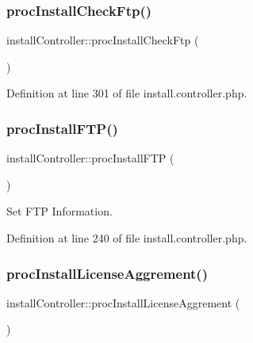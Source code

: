 \subsubsection{\texorpdfstring{proc\+Install\+Check\+Ftp()}{procInstallCheckFtp()}}
{\footnotesize\ttfamily install\+Controller\+::proc\+Install\+Check\+Ftp (\begin{DoxyParamCaption}{ }\end{DoxyParamCaption})}



Definition at line 301 of file install.\+controller.\+php.

\hypertarget{classinstallController_af955577b33b8125145df5e18f10c38a5}{}\label{classinstallController_af955577b33b8125145df5e18f10c38a5} 
\subsubsection{\texorpdfstring{proc\+Install\+F\+T\+P()}{procInstallFTP()}}
{\footnotesize\ttfamily install\+Controller\+::proc\+Install\+F\+TP (\begin{DoxyParamCaption}{ }\end{DoxyParamCaption})}



Set F\+TP Information. 



Definition at line 240 of file install.\+controller.\+php.

\hypertarget{classinstallController_a432aa2b801ee6ac5aaf11dd0a6678590}{}\label{classinstallController_a432aa2b801ee6ac5aaf11dd0a6678590} 
\subsubsection{\texorpdfstring{proc\+Install\+License\+Aggrement()}{procInstallLicenseAggrement()}}
{\footnotesize\ttfamily install\+Controller\+::proc\+Install\+License\+Aggrement (\begin{DoxyParamCaption}{ }\end{DoxyParamCaption})}



